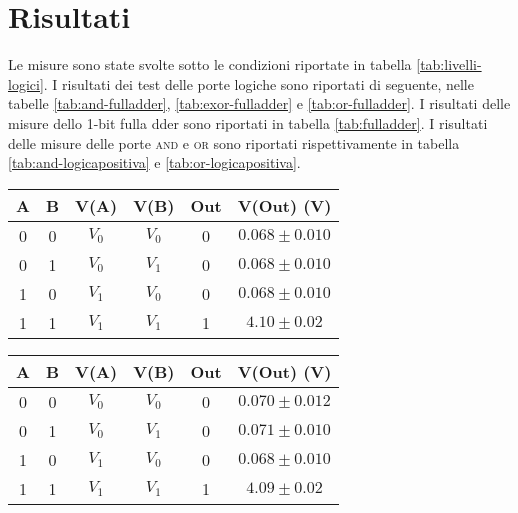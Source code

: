\section{Risultati}\label{sec:risultati}
Le misure sono state svolte sotto le condizioni riportate in tabella \ref{tab:livelli-logici}.
I risultati dei test delle porte logiche sono riportati di seguente, nelle tabelle \ref{tab:and-fulladder}, \ref{tab:exor-fulladder} e \ref{tab:or-fulladder}.
I risultati delle misure dello 1-bit fulla dder sono riportati in tabella \ref{tab:fulladder}.
I risultati delle misure delle porte \textsc{and} e \textsc{or} sono riportati rispettivamente in tabella \ref{tab:and-logicapositiva} e \ref{tab:or-logicapositiva}.

\begin{table}[H]
  \centering
  \begin{subtable}[H]{0.5\textwidth}
    \centering
    \begin{tabular}[t]{c  c | c  c | c  c}
      \hline
      A & B & V(A) & V(B) & Out & V(Out) (V)\\
      \hline
      0 & 0 & $V_{0}$ & $V_{0}$ & 0 & $0.068 \pm 0.010$ \\
      0 & 1 & $V_{0}$ & $V_{1}$ & 0 & $0.068 \pm 0.010$ \\
      1 & 0 & $V_{1}$ & $V_{0}$ & 0 & $0.068 \pm 0.010$ \\
      1 & 1 & $V_{1}$ & $V_{1}$ & 1 & $4.10 \pm 0.02$ \\
      \hline
    \end{tabular}
  \end{subtable}

  \vspace{.5cm}

  \begin{subtable}[H]{0.5\textwidth}
    \centering
    \begin{tabular}[t]{c  c | c  c | c  c}
      \hline
      A & B & V(A) & V(B) & Out & V(Out) (V)\\
      \hline
      0 & 0 & $V_{0}$ & $V_{0}$ & 0 & $0.070 \pm 0.012$ \\
      0 & 1 & $V_{0}$ & $V_{1}$ & 0 & $0.071 \pm 0.010$ \\
      1 & 0 & $V_{1}$ & $V_{0}$ & 0 & $0.068 \pm 0.010$ \\
      1 & 1 & $V_{1}$ & $V_{1}$ & 1 & $4.09 \pm 0.02$ \\
      \hline
    \end{tabular}
  \end{subtable}


\end{table}
